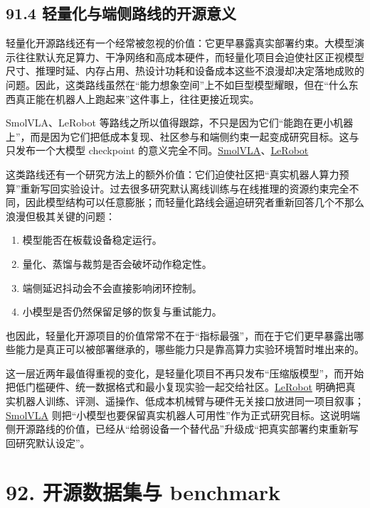 \subsection*{91.4 轻量化与端侧路线的开源意义}


轻量化开源路线还有一个经常被忽视的价值：它更早暴露真实部署约束。大模型演示往往默认充足算力、干净网络和高成本硬件，而轻量化项目会迫使社区正视模型尺寸、推理时延、内存占用、热设计功耗和设备成本这些不浪漫却决定落地成败的问题。因此，这类路线虽然在“能力想象空间”上不如巨型模型耀眼，但在“什么东西真正能在机器人上跑起来”这件事上，往往更接近现实。

SmolVLA、LeRobot 等路线之所以值得跟踪，不只是因为它们“能跑在更小机器上”，而是因为它们把低成本复现、社区参与和端侧约束一起变成研究目标。这与只发布一个大模型 checkpoint 的意义完全不同。\href{https://arxiv.org/abs/2506.01844}{SmolVLA}、\href{https://arxiv.org/abs/2602.22818}{LeRobot}

这类路线还有一个研究方法上的额外价值：它们迫使社区把“真实机器人算力预算”重新写回实验设计。过去很多研究默认离线训练与在线推理的资源约束完全不同，因此模型结构可以任意膨胀；而轻量化路线会逼迫研究者重新回答几个不那么浪漫但极其关键的问题：

\begin{enumerate}
\item 模型能否在板载设备稳定运行。
\item 量化、蒸馏与裁剪是否会破坏动作稳定性。
\item 端侧延迟抖动会不会直接影响闭环控制。
\item 小模型是否仍然保留足够的恢复与重试能力。
\end{enumerate}

也因此，轻量化开源项目的价值常常不在于“指标最强”，而在于它们更早暴露出哪些能力是真正可以被部署继承的，哪些能力只是靠高算力实验环境暂时堆出来的。

这一层近两年最值得重视的变化，是轻量化项目不再只发布“压缩版模型”，而开始把低门槛硬件、统一数据格式和最小复现实验一起交给社区。\href{https://github.com/huggingface/lerobot}{LeRobot} 明确把真实机器人训练、评测、遥操作、低成本机械臂与硬件无关接口放进同一项目叙事；\href{https://arxiv.org/abs/2506.01844}{SmolVLA} 则把“小模型也要保留真实机器人可用性”作为正式研究目标。这说明端侧开源路线的价值，已经从“给弱设备一个替代品”升级成“把真实部署约束重新写回研究默认设定”。

\section*{92. 开源数据集与 benchmark}


